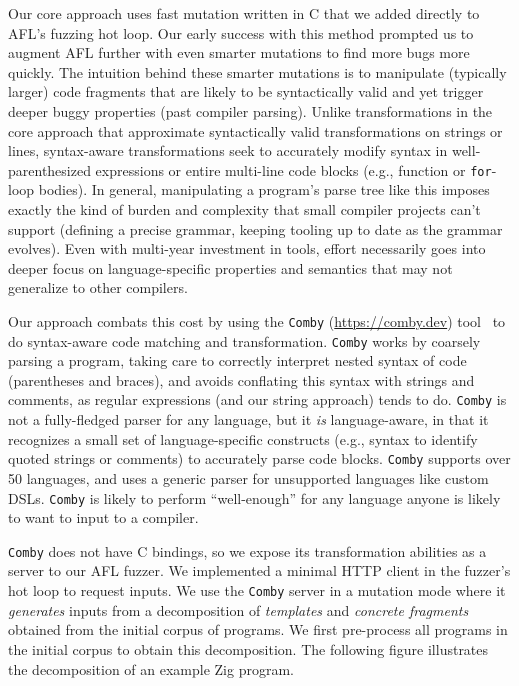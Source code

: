 \begin{sloppypar}
Our core approach uses fast mutation written in C that we added directly to
AFL's fuzzing hot loop. Our early success with this method prompted us to
augment AFL further with even smarter mutations to find more bugs more quickly.
The intuition behind these smarter mutations is to manipulate (typically
larger) code fragments that are likely to be syntactically valid and yet
trigger deeper buggy properties (past compiler parsing). Unlike transformations
in the core approach that approximate syntactically valid transformations on
strings or lines, syntax-aware transformations seek to accurately modify syntax
in well-parenthesized expressions or entire multi-line code blocks (e.g.,
function or \texttt{for}-loop bodies). In general, manipulating a program's
parse tree like this imposes exactly the kind of burden and complexity that
small compiler projects can't support (defining a precise grammar, keeping
tooling up to date as the grammar evolves). Even with multi-year investment in
tools, effort necessarily goes into deeper focus on
language-specific properties and semantics %
that may not generalize to other compilers.
\end{sloppypar}

\begin{sloppypar}
Our approach combats this cost by using the
\texttt{Comby} (\url{https://comby.dev}) tool~\cite{combypaper} to do
syntax-aware code matching and transformation. \texttt{Comby} works by coarsely
parsing a program, taking care to correctly interpret nested syntax of code
(parentheses and braces), and avoids conflating this syntax with strings and
comments, as regular expressions (and our string approach) tends to do.  \texttt{Comby} is not a fully-fledged
parser for any language, but it \emph{is} language-aware, in that it recognizes
a small set of language-specific constructs (e.g., syntax to identify quoted
strings or comments) to accurately parse code blocks. \texttt{Comby} supports
over 50 languages, and uses a generic parser for unsupported languages like custom
DSLs. \texttt{Comby} is likely to perform ``well-enough'' for any language
anyone is likely to want to input to a compiler.
\end{sloppypar}

\texttt{Comby} does not have C bindings, so we expose its transformation
abilities as a server to our AFL fuzzer. We implemented a minimal HTTP client
in the fuzzer's hot loop to request inputs. We use the \texttt{Comby} server in
a mutation mode where it \emph{generates} inputs from a decomposition of
\emph{templates} and \emph{concrete fragments} obtained from the initial corpus
of programs. We first pre-process all programs in the initial corpus to obtain
this decomposition. The following figure illustrates the decomposition of an
example Zig program.


